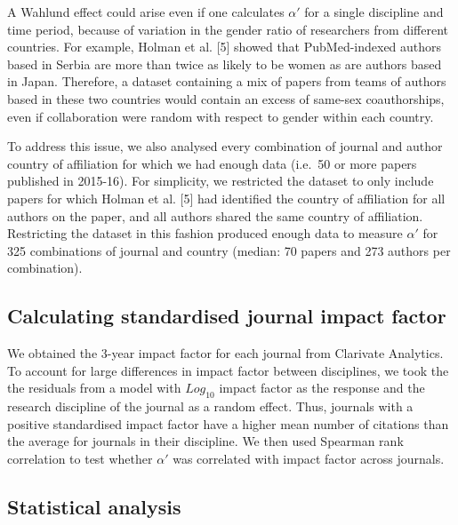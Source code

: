 \documentclass[12pt,]{article}
\begin{document}
A Wahlund effect could arise even if one calculates \(\alpha'\) for a
single discipline and time period, because of variation in the gender
ratio of researchers from different countries. For example, Holman et
al. {[}5{]} showed that PubMed-indexed authors based in Serbia are more
than twice as likely to be women as are authors based in Japan.
Therefore, a dataset containing a mix of papers from teams of authors
based in these two countries would contain an excess of same-sex
coauthorships, even if collaboration were random with respect to gender
within each country.

To address this issue, we also analysed every combination of journal and
author country of affiliation for which we had enough data (i.e.~50 or
more papers published in 2015-16). For simplicity, we restricted the
dataset to only include papers for which Holman et al. {[}5{]} had
identified the country of affiliation for all authors on the paper, and
all authors shared the same country of affiliation. Restricting the
dataset in this fashion produced enough data to measure \(\alpha'\) for
325 combinations of journal and country (median: 70 papers and 273
authors per combination).

\subsection{Calculating standardised journal impact
factor}\label{calculating-standardised-journal-impact-factor}

We obtained the 3-year impact factor for each journal from Clarivate
Analytics. To account for large differences in impact factor between
disciplines, we took the the residuals from a model with \(Log_{10}\)
impact factor as the response and the research discipline of the journal
as a random effect. Thus, journals with a positive standardised impact
factor have a higher mean number of citations than the average for
journals in their discipline. We then used Spearman rank correlation to
test whether \(\alpha'\) was correlated with impact factor across
journals.

\subsection{Statistical analysis}\label{statistical-analysis}
\end{document}
